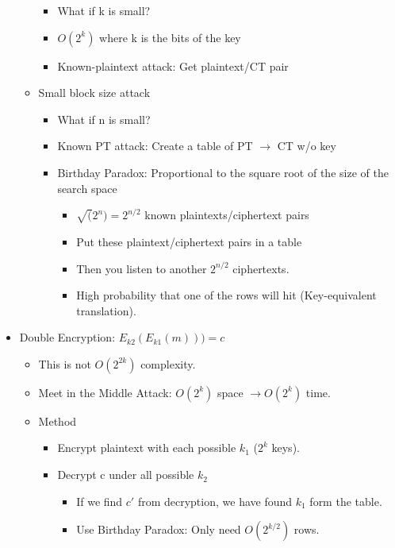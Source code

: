 \begin{itemize}
\begin{itemize}
        \begin{itemize}
        \item What if k is small?
        \item $O(2^k)$ where k is the bits of the key
        \item Known-plaintext attack: Get plaintext/CT pair
        \end{itemize}
    \item Small block size attack
        \begin{itemize}
        \item What if n is small?
        \item Known PT attack: Create a table of PT $\rightarrow$ CT w/o key
        \item Birthday Paradox: Proportional to the square root of the size of the search space
            \begin{itemize}
            \item $\sqrt(2^n) = 2^{n/2}$ known plaintexts/ciphertext pairs
            \item Put these plaintext/ciphertext pairs in a table
            \item Then you listen to another $2^{n/2}$ ciphertexts.
            \item High probability that one of the rows will hit (Key-equivalent translation).
            \end{itemize}
        \end{itemize}
    \end{itemize}
\item Double Encryption: $E_{k2}(E_{k1}(m))) = c$
    \begin{itemize}
    \item This is not $O(2^{2k})$ complexity.
    \item Meet in the Middle Attack: $O(2^k)$ space $\rightarrow O(2^k)$ time.
    \item Method
        \begin{itemize}
        \item Encrypt plaintext with each possible $k_1$ ($2^k$ keys).
        \item Decrypt c under all possible $k_2$
            \begin{itemize}
            \item If we find $c'$ from decryption, we have found $k_1$ form the table.
            \item Use Birthday Paradox: Only need $O(2^{k/2})$ rows.
            \end{itemize}

\end{itemize}
\end{itemize}
\end{itemize}
